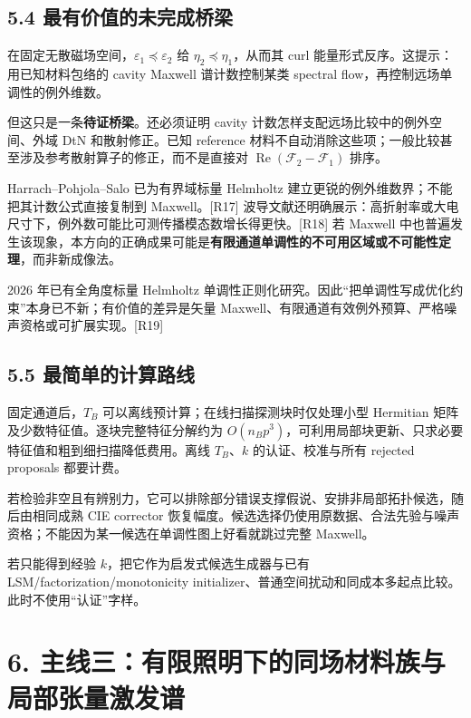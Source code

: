 \documentclass[11pt,a4paper]{article}
\begin{document}
\hypertarget{ux6700ux6709ux4ef7ux503cux7684ux672aux5b8cux6210ux6865ux6881}{%
\subsection{5.4
最有价值的未完成桥梁}\label{ux6700ux6709ux4ef7ux503cux7684ux672aux5b8cux6210ux6865ux6881}}

在固定无散磁场空间，\(\varepsilon_1\preceq\varepsilon_2\) 给
\(\eta_2\preceq\eta_1\)，从而其 curl
能量形式反序。这提示：用已知材料包络的 cavity Maxwell 谱计数控制某类
spectral flow，再控制远场单调性的例外维数。

但这只是一条\textbf{待证桥梁}。还必须证明 cavity
计数怎样支配远场比较中的例外空间、外域 DtN 和散射修正。已知 reference
材料不自动消除这些项；一般比较甚至涉及参考散射算子的修正，而不是直接对
\(\operatorname{Re}(\mathcal F_2-\mathcal F_1)\) 排序。

Harrach--Pohjola--Salo 已为有界域标量 Helmholtz
建立更锐的例外维数界；不能把其计数公式直接复制到 Maxwell。{[}R17{]}
波导文献还明确展示：高折射率或大电尺寸下，例外数可能比可测传播模态数增长得更快。{[}R18{]}
若 Maxwell
中也普遍发生该现象，本方向的正确成果可能是\textbf{有限通道单调性的不可用区域或不可能性定理}，而非新成像法。

2026 年已有全角度标量 Helmholtz
单调性正则化研究。因此``把单调性写成优化约束''本身已不新；有价值的差异是矢量
Maxwell、有限通道有效例外预算、严格噪声资格或可扩展实现。{[}R19{]}

\hypertarget{ux6700ux7b80ux5355ux7684ux8ba1ux7b97ux8defux7ebf}{%
\subsection{5.5
最简单的计算路线}\label{ux6700ux7b80ux5355ux7684ux8ba1ux7b97ux8defux7ebf}}

固定通道后，\(T_B\) 可以离线预计算；在线扫描探测块时仅处理小型 Hermitian
矩阵及少数特征值。逐块完整特征分解约为
\(O(n_Bp^3)\)，可利用局部块更新、只求必要特征值和粗到细扫描降低费用。离线
\(T_B\)、\(k\) 的认证、校准与所有 rejected proposals 都要计费。

若检验非空且有辨别力，它可以排除部分错误支撑假说、安排非局部拓扑候选，随后由相同成熟
CIE corrector
恢复幅度。候选选择仍使用原数据、合法先验与噪声资格；不能因为某一候选在单调性图上好看就跳过完整
Maxwell。

若只能得到经验 \(k\)，把它作为启发式候选生成器与已有
LSM/factorization/monotonicity
initializer、普通空间扰动和同成本多起点比较。此时不使用``认证''字样。

\hypertarget{ux4e3bux7ebfux4e09ux6709ux9650ux7167ux660eux4e0bux7684ux540cux573aux6750ux6599ux65cfux4e0eux5c40ux90e8ux5f20ux91cfux6fc0ux53d1ux8c31}{%
\section{6.
主线三：有限照明下的同场材料族与局部张量激发谱}\label{ux4e3bux7ebfux4e09ux6709ux9650ux7167ux660eux4e0bux7684ux540cux573aux6750ux6599ux65cfux4e0eux5c40ux90e8ux5f20ux91cfux6fc0ux53d1ux8c31}}
\end{document}
